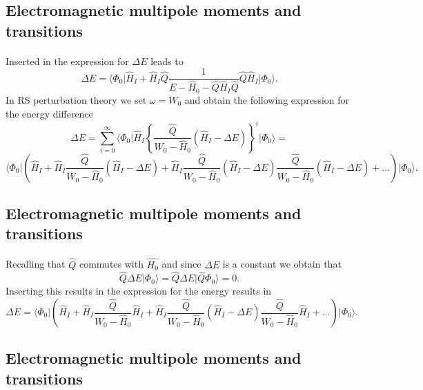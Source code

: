 \documentclass[%
twoside,                 %
final,                   %
10pt]{article}
\begin{document}
\subsection*{Electromagnetic multipole moments and transitions}

\paragraph{}
Inserted in the expression for $\Delta E$ leads to 
\[
\Delta E=
\langle \Phi_0\vert \hat{H}_I+\hat{H}_I\hat{Q}\frac{1}{E-\hat{H}_0-\hat{Q}\hat{H}_I\hat{Q}}\hat{Q}\hat{H}_I\vert \Phi_0\rangle. 
\]
In RS perturbation theory we set $\omega = W_0$ and obtain the following expression for the energy difference
\[
\Delta E=\sum_{i=0}^{\infty}\langle \Phi_0\vert \hat{H}_I\left\{\frac{\hat{Q}}{W_0-\hat{H}_0}\left(\hat{H}_I-\Delta E\right)\right\}^i\vert \Phi_0\rangle=
\]
\[
\langle \Phi_0\vert \left(\hat{H}_I+\hat{H}_I\frac{\hat{Q}}{W_0-\hat{H}_0}(\hat{H}_I-\Delta E)+
\hat{H}_I\frac{\hat{Q}}{W_0-\hat{H}_0}(\hat{H}_I-\Delta E)\frac{\hat{Q}}{W_0-\hat{H}_0}(\hat{H}_I-\Delta E)+\dots\right)\vert \Phi_0\rangle.
\]



\subsection*{Electromagnetic multipole moments and transitions}

\paragraph{}
Recalling that $\hat{Q}$ commutes with $\hat{H_0}$ and since $\Delta E$ is a constant we obtain that
\[
\hat{Q}\Delta E\vert \Phi_0\rangle = \hat{Q}\Delta E\vert \hat{Q}\Phi_0\rangle = 0.
\]
Inserting this results in the expression for the energy results in
\[
\Delta E=\langle \Phi_0\vert \left(\hat{H}_I+\hat{H}_I\frac{\hat{Q}}{W_0-\hat{H}_0}\hat{H}_I+
\hat{H}_I\frac{\hat{Q}}{W_0-\hat{H}_0}(\hat{H}_I-\Delta E)\frac{\hat{Q}}{W_0-\hat{H}_0}\hat{H}_I+\dots\right)\vert \Phi_0\rangle.
\]



\subsection*{Electromagnetic multipole moments and transitions}
\end{document}

